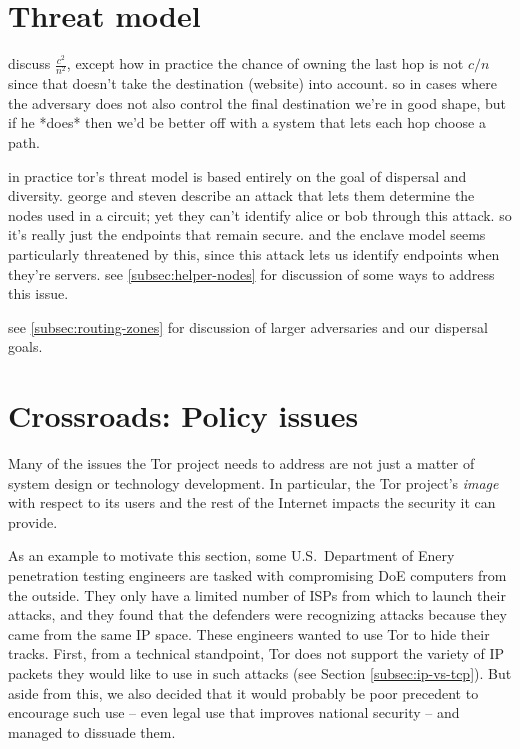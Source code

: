 \documentclass{llncs}
\begin{document}
\section{Threat model}

discuss $\frac{c^2}{n^2}$, except how in practice the chance of owning
the last hop is not $c/n$ since that doesn't take the destination (website)
into account. so in cases where the adversary does not also control the
final destination we're in good shape, but if he *does* then we'd be better
off with a system that lets each hop choose a path.

in practice tor's threat model is based entirely on the goal of dispersal
and diversity. george and steven describe an attack \cite{draft} that
lets them determine the nodes used in a circuit; yet they can't identify
alice or bob through this attack. so it's really just the endpoints that
remain secure. and the enclave model seems particularly threatened by
this, since this attack lets us identify endpoints when they're servers.
see \ref{subsec:helper-nodes} for discussion of some ways to address this
issue.

see \ref{subsec:routing-zones} for discussion of larger
adversaries and our dispersal goals.

\section{Crossroads: Policy issues}
\label{sec:crossroads-policy}

Many of the issues the Tor project needs to address are not just a
matter of system design or technology development. In particular, the
Tor project's \emph{image} with respect to its users and the rest of
the Internet impacts the security it can provide.

As an example to motivate this section, some U.S.~Department of Enery
penetration testing engineers are tasked with compromising DoE computers
from the outside. They only have a limited number of ISPs from which to
launch their attacks, and they found that the defenders were recognizing
attacks because they came from the same IP space. These engineers wanted
to use Tor to hide their tracks. First, from a technical standpoint,
Tor does not support the variety of IP packets they would like to use in
such attacks (see Section \ref{subsec:ip-vs-tcp}). But aside from this,
we also decided that it would probably be poor precedent to encourage
such use -- even legal use that improves national security -- and managed
to dissuade them.
\end{document}
